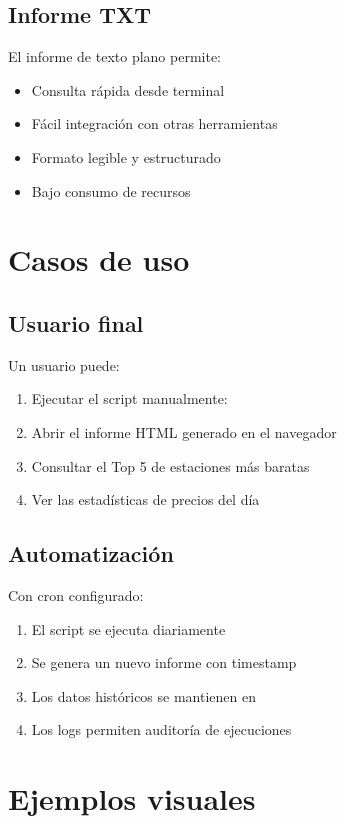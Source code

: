 \subsection{Informe TXT}

El informe de texto plano permite:

\begin{itemize}
  \item Consulta rápida desde terminal
  \item Fácil integración con otras herramientas
  \item Formato legible y estructurado
  \item Bajo consumo de recursos
\end{itemize}

\section{Casos de uso}

\subsection{Usuario final}

Un usuario puede:
\begin{enumerate}
  \item Ejecutar el script manualmente: 
  \item Abrir el informe HTML generado en el navegador
  \item Consultar el Top 5 de estaciones más baratas
  \item Ver las estadísticas de precios del día
\end{enumerate}

\subsection{Automatización}

Con cron configurado:
\begin{enumerate}
  \item El script se ejecuta diariamente
  \item Se genera un nuevo informe con timestamp
  \item Los datos históricos se mantienen en 
  \item Los logs permiten auditoría de ejecuciones
\end{enumerate}

\section{Ejemplos visuales}

